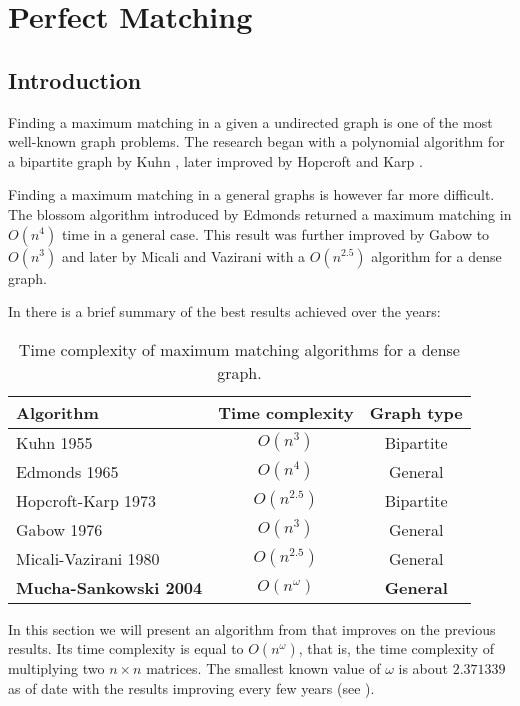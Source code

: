 \chapter{Perfect Matching}
\section{Introduction}
Finding a maximum matching in a given a undirected graph is one of the most well-known graph problems. The research began with a polynomial algorithm for a bipartite graph by Kuhn \cite{kuhn}, later improved by Hopcroft and Karp \cite{hopcroft-karp}.

Finding a maximum matching in a general graphs is however far more difficult. The blossom algorithm introduced by Edmonds \cite{edmonds} returned a maximum matching in $O(n^4)$ time in a general case. This result was further improved by Gabow \cite{gabow} to $O(n^3)$ and later by Micali and Vazirani \cite{micali-vazirani} with a $O(n^{2.5})$ algorithm for a dense graph.

In  there is a brief summary of the best results achieved over the years:

\begin{table}[htbp]
\begin{center}
\begin{tabular}{ |l||c|c|  }
 \hline
 \textbf{Algorithm} & \textbf{Time complexity} & \textbf{Graph type} \\
 \hline
 Kuhn 1955 \cite{kuhn} & \centering $O(n^3)$ & Bipartite \\
 Edmonds 1965 \cite{edmonds} & \centering $O(n^4)$ & General \\
 Hopcroft-Karp 1973 \cite{hopcroft-karp} & \centering $O(n^{2.5})$ & Bipartite \\
 Gabow 1976 \cite{gabow} & \centering $O(n^3)$ & General \\
 Micali-Vazirani 1980 \cite{micali-vazirani} & \centering $O(n^{2.5})$ & General \\
 \hdashline
 \textbf{Mucha-Sankowski 2004 \cite{mucha}} & \centering $O(n^\omega)$ & \textbf{General} \\
 \hline
\end{tabular}
\caption{Time complexity of maximum matching algorithms for a dense graph.}
\label{tab:algorithm}
\end{center}
\end{table}

In this section we will present an algorithm from \cite{mucha} that improves on the previous results. Its time complexity is equal to $O(n^\omega)$, that is, the time complexity of multiplying two $n \times n$ matrices. The smallest known value of $\omega$ is about $2.371339$ as of date with the results improving every few years (see ).

